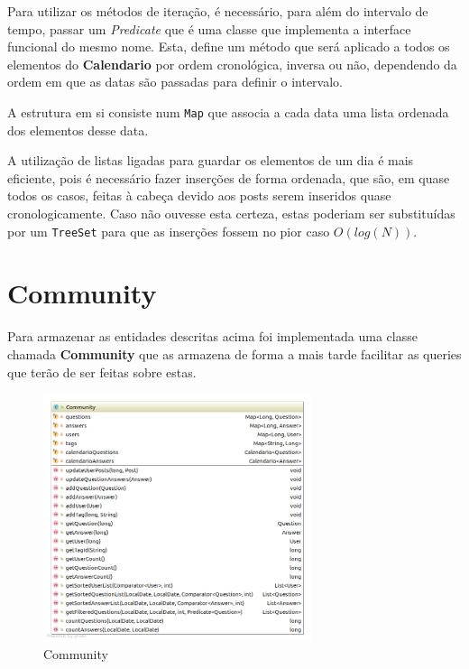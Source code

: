 \documentclass[10pt,a4paper]{report}
\begin{document}
        Para utilizar os métodos de iteração, é necessário, para além do
        intervalo de tempo, passar um \textit{Predicate} que é uma classe que
        implementa a interface funcional do mesmo nome. Esta, define um método
        que será aplicado a todos os elementos do \textbf{Calendario} por ordem
        cronológica, inversa ou não, dependendo da ordem em que as datas são
        passadas para definir o intervalo.

        A estrutura em si consiste num \texttt{Map} que associa a cada
        data uma lista ordenada dos elementos desse data.

        A utilização de listas ligadas para guardar os elementos de um dia é
        mais eficiente, pois é necessário fazer inserções de forma ordenada, 
        que são, em quase todos os casos, feitas à cabeça devido aos posts serem
        inseridos quase cronologicamente. Caso não ouvesse esta certeza, estas 
        poderiam ser substituídas por um \texttt{TreeSet} para que 
        as inserções fossem no pior caso $O(log(N))$.

    \section{Community}
    Para armazenar as entidades descritas acima foi implementada uma classe
    chamada \textbf{Community} que as armazena de forma a mais tarde facilitar
    as queries que terão de ser feitas sobre estas.

    \begin{figure}[H]
        \centering
        \includegraphics[width=0.7\textwidth]{./images/Community.png}
        \caption{Community}
    \end{figure}
\end{document}
